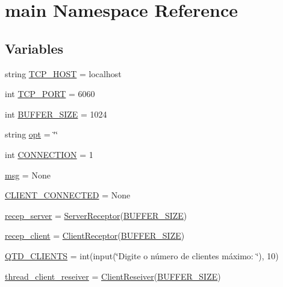 \hypertarget{namespacemain}{}\section{main Namespace Reference}
\label{namespacemain}
\subsection*{Variables}
\begin{DoxyCompactItemize}
\item 
string \hyperlink{namespacemain_a569a69b9efcb7fa479feab68de055c12}{T\+C\+P\+\_\+\+H\+O\+ST} = \textquotesingle{}localhost\textquotesingle{}
\item 
int \hyperlink{namespacemain_abc7b299bafa1e6391d54814cd3f3ae0a}{T\+C\+P\+\_\+\+P\+O\+RT} = 6060
\item 
int \hyperlink{namespacemain_acd8d62179f75714af34ae50caa397a73}{B\+U\+F\+F\+E\+R\+\_\+\+S\+I\+ZE} = 1024
\item 
string \hyperlink{namespacemain_a2d62ba85ba6e1ecc078bb70d8ec593dd}{opt} = \char`\"{}\char`\"{}
\item 
int \hyperlink{namespacemain_a0495bae70bef3447c8a408fb0eea1032}{C\+O\+N\+N\+E\+C\+T\+I\+ON} = 1
\item 
\hyperlink{namespacemain_a10a0f35066079abd150539d0d13dbf3e}{msg} = None
\item 
\hyperlink{namespacemain_a41c8678c8804b3188a761b00a649d445}{C\+L\+I\+E\+N\+T\+\_\+\+C\+O\+N\+N\+E\+C\+T\+ED} = None
\item 
\hyperlink{namespacemain_a2b1c523c93c469ce345f4d5bd46941a4}{recep\+\_\+server} = \hyperlink{class_client_1_1_server_receptor}{Server\+Receptor}(\hyperlink{namespacemain_acd8d62179f75714af34ae50caa397a73}{B\+U\+F\+F\+E\+R\+\_\+\+S\+I\+ZE})
\item 
\hyperlink{namespacemain_ad58616dba9ef0f00a45619fc8b69274d}{recep\+\_\+client} = \hyperlink{class_client_1_1_client_receptor}{Client\+Receptor}(\hyperlink{namespacemain_acd8d62179f75714af34ae50caa397a73}{B\+U\+F\+F\+E\+R\+\_\+\+S\+I\+ZE})
\item 
\hyperlink{namespacemain_af68b8ff0c3bf26b8976bbd617a929a5e}{Q\+T\+D\+\_\+\+C\+L\+I\+E\+N\+TS} = int(input(\char`\"{}Digite o número de clientes máximo\+: \char`\"{}), 10)
\item 
\hyperlink{namespacemain_a61ef917c0f77e0d6d71d4c7137362372}{thread\+\_\+client\+\_\+reseiver} = \hyperlink{class_client_1_1_client_reseiver}{Client\+Reseiver}(\hyperlink{namespacemain_acd8d62179f75714af34ae50caa397a73}{B\+U\+F\+F\+E\+R\+\_\+\+S\+I\+ZE})

\end{DoxyCompactItemize}
